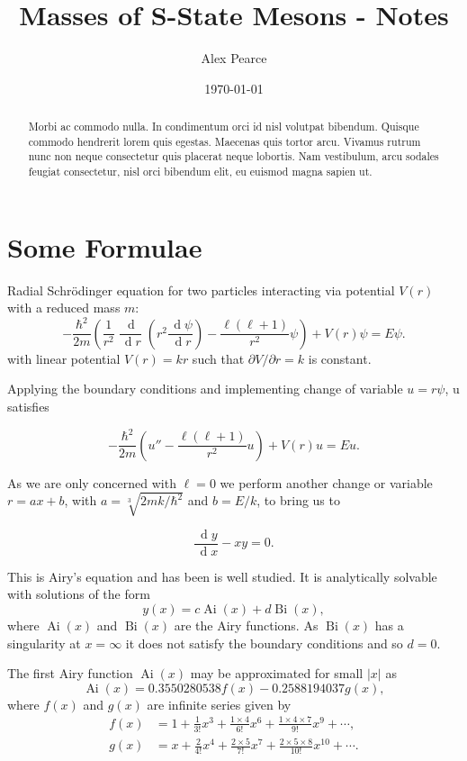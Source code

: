 \documentclass[]{article}
\renewcommand{\d}[1]{\ensuremath{\,\operatorname{d}\!{#1}}}
\renewcommand{\mod}[1]{\ensuremath{\lvert {#1} \rvert}}
\newcommand{\Ai}[1]{\ensuremath{\operatorname{Ai}({#1})}}
\newcommand{\Bi}[1]{\ensuremath{\operatorname{Bi}({#1})}}
\begin{document}
\title{Masses of S-State Mesons - Notes}
\author{Alex Pearce}
\date{\today}
\maketitle


\begin{abstract}
Morbi ac commodo nulla. In condimentum orci id nisl volutpat bibendum. Quisque commodo hendrerit lorem quis egestas. Maecenas quis tortor arcu. Vivamus rutrum nunc non neque consectetur quis placerat neque lobortis. Nam vestibulum, arcu sodales feugiat consectetur, nisl orci bibendum elit, eu euismod magna sapien ut.
\end{abstract}

\section{Some Formulae}

Radial Schr\"{o}dinger equation for two particles interacting via potential $V(r)$ with a reduced mass $m$:
\[
-\frac{\hbar^{2}}{2m}\left (
	\frac{1}{r^{2}} \frac{\d{}}{\d{r}} \left (
		r^{2} \frac{\d{\psi}}{\d{r}}
	\right )
	- \frac{\ell(\ell+1)}{r^{2}}\psi
\right )
+ V(r)\psi = E\psi.
\]
with linear potential $V(r) = kr$ such that $\partial V / \partial r = k$ is constant.

Applying the boundary conditions and implementing change of variable $u = r\psi$, u satisfies

\[
-\frac{\hbar^{2}}{2m}\left (
	u''
	- \frac{\ell(\ell+1)}{r^{2}}u
\right )
+ V(r)u = Eu.
\]

As we are only concerned with $\ell = 0$ we perform another change or variable $r = ax + b$, with $a = \sqrt[3]{2mk/\hbar^{2}}$ and $b = E/k$, to bring us to

\[
\frac{\d{y}}{\d{x}} - xy = 0.
\]

This is Airy's equation and has been is well studied. It is analytically solvable with solutions of the form
\[
y(x) = c\Ai{x} + d\Bi{x},
\]
where $\Ai{x}$ and $\Bi{x}$ are the Airy functions. As $\Bi{x}$ has a singularity at $x=\infty$ it does not satisfy the boundary conditions and so $d=0$.

The first Airy function $\Ai{x}$ may be approximated for small $\mod{x}$ as
\[
\Ai{x} = 0.3550280538f(x) - 0.2588194037g(x),
\]
where $f(x)$ and $g(x)$ are infinite series given by
\begin{align*}
f(x) &= 1 + \frac{1}{3!}x^{3} + \frac{1\times4}{6!}x^{6} + \frac{1\times4\times{7}}{9!}x^{9} + \dotsb,\\
g(x) &= x + \frac{2}{4!}x^{4} + \frac{2\times5}{7!}x^{7} + \frac{2\times5\times{8}}{10!}x^{10} + \dotsb.
\end{align*}
\end{document}
